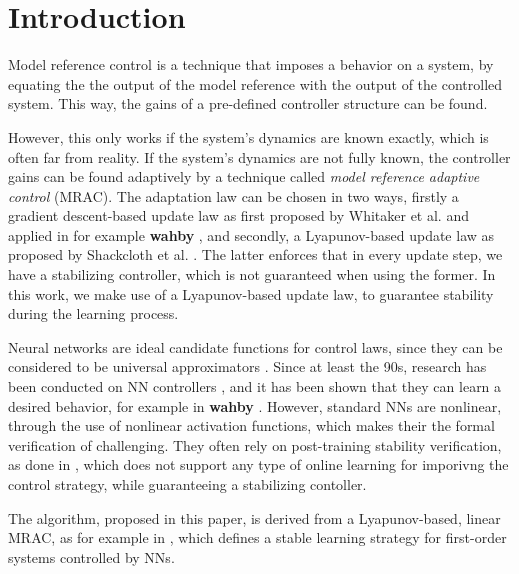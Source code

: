 \section{Introduction}
Model reference control is a technique that imposes a behavior on a system, by equating the the output of the model reference with the output of the controlled system. This way, the gains of a pre-defined controller structure can be found. 

However, this only works if the system's dynamics are known exactly, which is often far from reality. If the system's dynamics are not fully known, the controller gains can be found adaptively by a technique called \textit{model reference adaptive control} (MRAC). The adaptation law can be chosen in two ways, firstly a gradient descent-based update law as first proposed by Whitaker et al. \cite{whitaker1959adaptive} and applied in for example \textbf{wahby} \cite{bosshartComparisonTwoPID2021}, and secondly, a Lyapunov-based update law as proposed by Shackcloth et al. \cite{shackclothSynthesisModelReference1965}. The latter enforces that in every update step, we have a stabilizing controller, which is not guaranteed when using the former. In this work, we make use of a Lyapunov-based update law, to guarantee stability during the learning process.

Neural networks are ideal candidate functions for control laws, since they can be considered to be universal approximators \cite{hornikUniversalApproximationUnknown1990a}. Since at least the 90s, research has been conducted on NN controllers \cite{jiangBriefReviewNeural2017}, and it has been shown that they can learn a desired behavior, for example in \textbf{wahby} \cite{congPIDLikeNeuralNetwork2009,thanhNonlinearPIDControl2006,norrisNeuralNetworksControl2021}. However, standard NNs are nonlinear, through the use of nonlinear activation functions, which makes their the formal verification of challenging. They often rely on post-training stability verification, as done in \cite{kordaStabilityPerformanceVerification2022} , which does not support any type of online learning for imporivng the control strategy, while guaranteeing a stabilizing contoller.


The algorithm, proposed in this paper, is derived from a Lyapunov-based, linear MRAC, as for example in \cite{lavretskyCombinedCompositeModel2009, slamaModelReferenceAdaptive2018,astromAdaptiveControl2008}, which defines a stable learning strategy for first-order systems controlled by NNs.